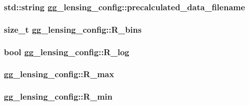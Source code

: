 \subsubsection[{precalculated\+\_\+data\+\_\+filename}]{\setlength{\rightskip}{0pt plus 5cm}std\+::string gg\+\_\+lensing\+\_\+config\+::precalculated\+\_\+data\+\_\+filename}\label{structgg__lensing__config_a8bc252029c599446dfbba897920eca0f}
\hypertarget{structgg__lensing__config_a0222122d7470e67e7aeb52096fcb6f90}{}
\subsubsection[{R\+\_\+bins}]{\setlength{\rightskip}{0pt plus 5cm}size\+\_\+t gg\+\_\+lensing\+\_\+config\+::\+R\+\_\+bins}\label{structgg__lensing__config_a0222122d7470e67e7aeb52096fcb6f90}
\hypertarget{structgg__lensing__config_a4ca415b5664d589eadea71166aaba4bc}{}
\subsubsection[{R\+\_\+log}]{\setlength{\rightskip}{0pt plus 5cm}bool gg\+\_\+lensing\+\_\+config\+::\+R\+\_\+log}\label{structgg__lensing__config_a4ca415b5664d589eadea71166aaba4bc}
\hypertarget{structgg__lensing__config_a18e40e60fa8b0f06e7550eb3c0411a8b}{}
\subsubsection[{R\+\_\+max}]{ gg\+\_\+lensing\+\_\+config\+::\+R\+\_\+max}\label{structgg__lensing__config_a18e40e60fa8b0f06e7550eb3c0411a8b}
\hypertarget{structgg__lensing__config_a14445ac28a5b6e168d407b5a862fa186}{}
\subsubsection[{R\+\_\+min}]{ gg\+\_\+lensing\+\_\+config\+::\+R\+\_\+min}\label{structgg__lensing__config_a14445ac28a5b6e168d407b5a862fa186}
\hypertarget{structgg__lensing__config_a3fe4ca186ed399f741d499e1e0e4acf8}{}
